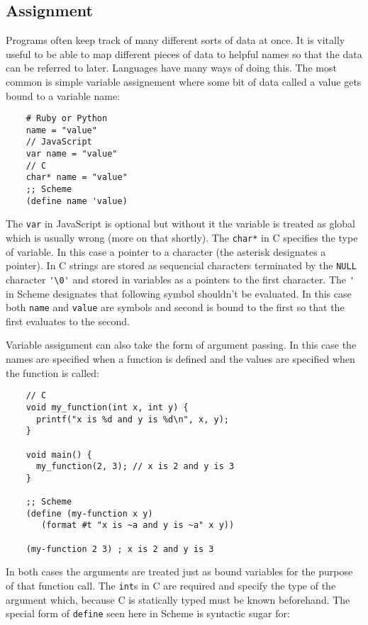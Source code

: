 \documentclass[11pt]{article}
\begin{document}
\subsection*{Assignment}
\label{sec-1.2}

   Programs often keep track of many different sorts of data at once.
   It is vitally useful to be able to map different pieces of data to
   helpful names so that the data can be referred to later.  Languages
   have many ways of doing this.  The most common is simple variable
   assignement where some bit of data called a value gets bound to a
   variable name:
   
\begin{verbatim}
    # Ruby or Python
    name = "value"
    // JavaScript
    var name = "value"
    // C
    char* name = "value"
    ;; Scheme
    (define name 'value)
\end{verbatim}

   
   The \verb|var| in JavaScript is optional but without it the variable is
   treated as global which is usually wrong (more on that shortly).  The
   \verb|char*| in C specifies the type of variable.  In this case a
   pointer to a character (the asterisk designates a pointer).  In C
   strings are stored as sequencial characters terminated by the
   \verb|NULL| character \verb|'\0'| and stored in variables as a pointers to the
   first character.  The \verb|'| in Scheme designates that following
   symbol shouldn't be evaluated.  In this case both \verb|name| and
   \verb|value| are symbols and second is bound to the first so that
   the first evaluates to the second.
   
   Variable assignment can also take the form of argument passing.  In
   this case the names are specified when a function is defined and
   the values are specified when the function is called:
   
\begin{verbatim}
    // C
    void my_function(int x, int y) {
      printf("x is %d and y is %d\n", x, y);
    }
    
    void main() {
      my_function(2, 3); // x is 2 and y is 3
    }
    
    ;; Scheme
    (define (my-function x y)
       (format #t "x is ~a and y is ~a" x y))
    
    (my-function 2 3) ; x is 2 and y is 3
\end{verbatim}

   
   In both cases the arguments are treated just as bound variables for
   the purpose of that function call.  The \verb|int|s in C are
   required and specify the type of the argument which, because C is
   statically typed must be known beforehand.  The special form of
   \verb|define| seen here in Scheme is syntactic sugar for:
   
\end{document}
